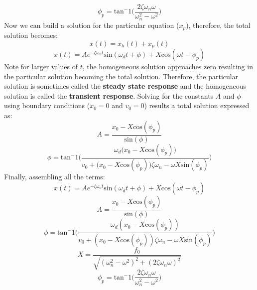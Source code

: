 \documentclass[12pt,letter]{article}
\numberwithin{ex}{section} %
\numberwithin{re}{section} %
\begin{document}
			\begin{equation}
				\phi_p = \text{tan}^-1\bigg(\frac{2\zeta \omega_n \omega}{\omega_n^2 - \omega^2}\bigg)
			\end{equation}				
			Now we can build a solution for the particular equation ($x_p$), therefore, the total solution becomes:
			\begin{equation}
				x(t) = x_h(t) + x_p(t)
			\end{equation}
			\begin{equation}
				x(t) = Ae^{-\zeta \omega_n t}\text{sin}(\omega_d t + \phi) +  X \text{cos}(\omega t - \phi_p)
			\end{equation}				
			Note for larger values of $t$, the homogeneous solution approaches zero resulting in the particular solution becoming the total solution. Therefore, the particular solution is sometimes called the \textbf{steady state response} and the homogeneous solution is called the \textbf{transient response}. Solving for the constants $A$ and $\phi$ using boundary conditions ($x_0=0$ and $v_0=0$) results a total solution expressed as:
			\begin{equation}
				A = \frac{x_0 -X \text{cos}(\phi_p)}{\text{sin}(\phi)}
			\end{equation}			 
			\begin{equation}
				\phi =  \text{tan}^-1\bigg(\frac{\omega_d \big( x_0 -X \text{cos}(\phi_p)\big)}{v_0 + \big(x_0 - X \text{cos}(\phi_p)\big) \zeta \omega_n - \omega X \text{sin}(\phi_p) }\bigg)
			\end{equation}			
			Finally, assembling all the terms:
			\begin{equation}
				x(t) = Ae^{-\zeta \omega_n t}\text{sin}(\omega_d t + \phi) +  X \text{cos}(\omega t - \phi_p)
				\label{eq:damped_forced_x}
			\end{equation}
			\begin{equation}
				A = \frac{x_0 -X \text{cos}(\phi_p)}{\text{sin}(\phi)}
			\end{equation}			 
			\begin{equation}
				\phi =  \text{tan}^-1\bigg(\frac{\omega_d ( x_0 -X \text{cos}(\phi_p))}{v_0 + (x_0 - X \text{cos}(\phi_p)) \zeta \omega_n - \omega X \text{sin}(\phi_p) }\bigg)
			\end{equation}	
			\begin{equation}
				X = \frac{f_0}{\sqrt{(\omega_n^2 - \omega^2)^2 +  (2\zeta \omega_n \omega)^2}} 
			\end{equation}	
			\begin{equation}
				\phi_p = \text{tan}^-1\bigg(\frac{2\zeta \omega_n \omega}{\omega_n^2 - \omega^2}\bigg)
				\label{eq:damped_forced_theta_p}
			\end{equation}		
\end{document}
